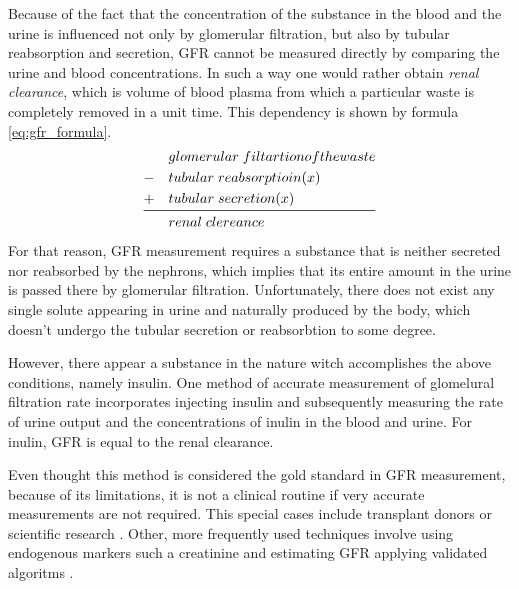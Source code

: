 Because of the fact that the concentration of the substance in the blood and the urine is influenced not only by glomerular filtration, but also by tubular reabsorption and secretion, GFR cannot be measured directly by comparing the urine and blood concentrations. In such a way one would rather obtain \textit{renal clearance}, which is volume of blood plasma from which a particular waste is completely removed in a unit time. This dependency is shown by formula \ref{eq:gfr_formula}.
\begin{equation}
\begin{aligned}
&glomerular\;filtartion of the waste\\
-\quad&tubular\;reabsorptioin(x)\\
+\quad&tubular\;secretion(x)\\
\midrule
&renal\;clereance
\end{aligned}	
\label{eq:gfr_formula}
\end{equation}
For that reason, GFR measurement requires
a substance that is neither secreted nor reabsorbed by the nephrons, which implies that its entire amount in the urine is passed there by glomerular filtration. Unfortunately, there does not exist any single solute appearing in urine and naturally produced by the body, which doesn't undergo the tubular secretion or reabsorbtion to some degree. 

However, there appear a substance in the nature witch accomplishes the above conditions, namely insulin. One method of accurate measurement of glomelural filtration rate incorporates injecting insulin and subsequently measuring the rate of urine output and the concentrations of inulin in the blood and urine. For inulin, GFR is equal to the renal clearance.


Even thought this method is considered the gold standard in GFR measurement, because of its limitations, it is not a clinical routine if very accurate measurements are not required. This special cases include transplant donors or scientific research \cite{traynor2006measure}. 
Other, more frequently used techniques involve using endogenous markers such a creatinine and estimating GFR applying validated algoritms \cite{delanaye2012measuring}. 
 